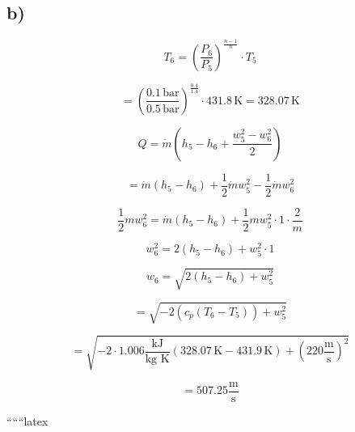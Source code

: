 

\subsection*{b)}

\[
T_6 = \left( \frac{P_6}{P_5} \right)^{\frac{n-1}{n}} \cdot T_5
\]

\[
= \left( \frac{0.1 \, \text{bar}}{0.5 \, \text{bar}} \right)^{\frac{0.4}{1.4}} \cdot 431.8 \, \text{K} = 328.07 \, \text{K}
\]

\[
Q = \dot{m} (h_5 - h_6 + \frac{w_5^2 - w_6^2}{2})
\]

\[
= \dot{m} (h_5 - h_6) + \frac{1}{2} \dot{m} w_5^2 - \frac{1}{2} \dot{m} w_6^2
\]

\[
\frac{1}{2} m w_6^2 = \dot{m} (h_5 - h_6) + \frac{1}{2} m w_5^2 \cdot 1 \cdot \frac{2}{m}
\]

\[
w_6^2 = 2 (h_5 - h_6) + w_5^2 \cdot 1
\]

\[
w_6 = \sqrt{2 (h_5 - h_6) + w_5^2}
\]

\[
= \sqrt{-2 (c_p (T_6 - T_5)) + w_5^2}
\]

\[
= \sqrt{-2 \cdot 1.006 \frac{\text{kJ}}{\text{kg K}} (328.07 \, \text{K} - 431.9 \, \text{K}) + (220 \frac{\text{m}}{\text{s}})^2}
\]

\[
= 507.25 \frac{\text{m}}{\text{s}}
\]

``````latex
